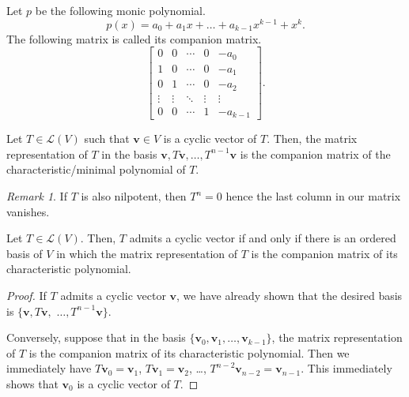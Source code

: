 \documentclass[11pt]{article}
\renewcommand{\vec}[1]{\boldsymbol{#1}}
\newcommand{\vv}{\vec{v}}
\newcommand{\alg}[1]{\mathscr{#1}}
\newcommand{\algL}{\alg{L}}
\theoremstyle{definition}
\theoremstyle{remark}
\newtheorem*{remark}{Remark}
\numberwithin{equation}{section}
\begin{document}
    \begin{definition}
        Let $p$ be the following monic polynomial. \[
            p(x) = a_0 + a_1x + \dots + a_{k - 1}x^{k - 1} + x^k.
        \] The following matrix is called its companion matrix. \[
            \begin{bmatrix}
                0 & 0 &  \cdots & 0 & -a_0 \\
                1 & 0 &  \cdots & 0 & -a_1 \\
                0 & 1 &  \cdots & 0 & -a_2 \\
                \vdots & \vdots & \ddots & \vdots & \vdots \\
                0 & 0 & \cdots & 1 & -a_{k - 1}
            \end{bmatrix}.
        \] 
    \end{definition}

    \begin{lemma}
        Let $T\in \algL(V)$ such that $\vv \in V$ is a cyclic vector of $T$. Then,
        the matrix representation of $T$ in the basis $\vv, T\vv, \dots, T^{n -
        1}\vv$ is the companion matrix of the characteristic/minimal polynomial of
        $T$.
        \begin{remark}
            If $T$ is also nilpotent, then $T^n = 0$ hence the last column in our
            matrix vanishes.
        \end{remark}
    \end{lemma}

    \begin{theorem}
        Let $T \in \algL(V)$. Then, $T$ admits a cyclic vector if and only if there
        is an ordered basis of $V$ in which the matrix representation of $T$ is the
        companion matrix of its characteristic polynomial.
    \end{theorem}
    \begin{proof}
        If $T$ admits a cyclic vector $\vv$, we have already shown that the desired
        basis is $\{\vv, T\vv,$ $\dots, T^{n - 1}\vv\}$.

        Conversely, suppose that in the basis $\{\vv_0, \vv_1, \dots, \vv_{k - 1}\}$,
        the matrix representation of $T$ is the companion matrix of its
        characteristic polynomial. Then we immediately have $T\vv_0 = \vv_1$, $T\vv_1
        = \vv_2$, \dots, $T^{n - 2}\vv_{n - 2} = \vv_{n - 1}$. This immediately shows
        that $\vv_0$ is a cyclic vector of $T$.
    \end{proof}
\end{document}
